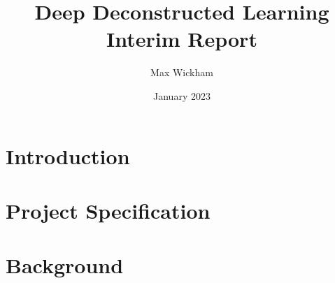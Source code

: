 \documentclass{article}
\title{Deep Deconstructed Learning \\
 Interim Report}
\author{Max Wickham }
\date{January 2023}
\begin{document}
\maketitle

\section{Introduction}

\section{Project Specification}


\section{Background}




\end{document}
